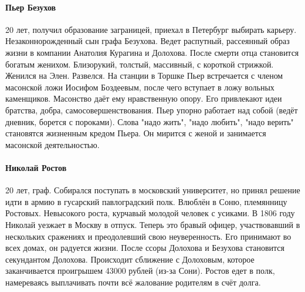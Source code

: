 \documentclass{article}
\begin{document}
\paragraph{Пьер Безухов}
20 лет, получил образование заграницей, приехал в Петербург выбирать карьеру. Незаконнорожденный сын графа Безухова.
Ведет распутный, рассеянный образ жизни в компании Анатолия Курагина и Долохова. После смерти отца становится
богатым женихом. Близорукий, толстый, массивный, с короткой стрижкой. Женился на Элен. Развелся.
На станции в Торшке Пьер встречается с членом масонской ложи Иосифом Боздеевым, после чего вступает в ложу вольных
каменщиков. Масонство даёт ему нравственную опору. Его привлекают идеи братства, добра, самосовершенствования.
Пьер упорно работает над собой (ведёт дневник, борется с пороками). Слова "надо жить", "надо любить", "надо верить"
становятся жизненным кредом Пьера. Он мирится с женой и занимается масонской деятельностью.
\paragraph{Николай Ростов}
20 лет, граф. Собирался поступать в московский университет, но принял решение идти в армию в гусарский павлоградский
полк. Влюблён в Соню, племянницу Ростовых. Невысокого роста, курчавый молодой человек с усиками.
В 1806 году Николай уезжает в Москву в отпуск.
Теперь это бравый офицер, участвовавший в нескольких сражениях и преодолевший свою неуверенность. Его принимают
во всех домах, он радуется жизни. После ссоры Долохова и Безухова становится секундантом Долохова.
Происходит сближение с Долоховым, которое заканчивается проигрышем 43000 рублей (из-за Сони). Ростов едет в полк,
намереваясь выплачивать почти всё жалование родителям в счёт долга.
\end{document}
